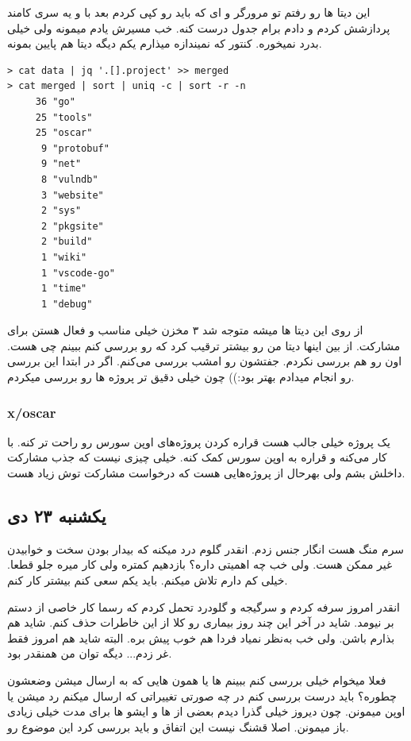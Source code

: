 این دیتا ها رو رفتم تو مرورگر و  ای که باید رو کپی کردم بعد با  و یه سری کامند پردازشش کردم و دادم  برام جدول درست کنه.
خب مسیرش یادم میمونه ولی خیلی بدرد نمیخوره. کنتور که نمیندازه میذارم یکم دیگه دیتا هم پایین بمونه.

\begin{latin}
\begin{verbatim}
> cat data | jq '.[].project' >> merged
> cat merged | sort | uniq -c | sort -r -n
     36 "go"
     25 "tools"
     25 "oscar"
      9 "protobuf"
      9 "net"
      8 "vulndb"
      3 "website"
      2 "sys"
      2 "pkgsite"
      2 "build"
      1 "wiki"
      1 "vscode-go"
      1 "time"
      1 "debug"
\end{verbatim}
\end{latin}

از روی این دیتا ها میشه متوجه شد ۳ مخزن  خیلی مناسب و فعال هستن برای مشارکت. از بین اینها دیتا من رو بیشتر ترقیب
کرد که  رو بررسی کنم ببینم چی هست. اون  رو هم بررسی نکردم. جفتشون رو امشب بررسی می‌کنم.
اگر در ابتدا این بررسی رو انجام میدادم بهتر بود:)) چون خیلی دقیق تر پروژه ها رو بررسی میکردم.

\subsubsection{x/oscar}
یک پروژه خیلی جالب هست قراره  کردن پروژه‌های اوپن سورس رو راحت تر کنه. با  کار می‌کنه و قراره به اوپن سورس کمک کنه.
خیلی چیزی نیست که جذب مشارکت داخلش بشم ولی بهرحال از پروژه‌هایی هست که درخواست مشارکت توش زیاد هست.

\subsection{یکشنبه ۲۳ دی}
سرم منگ هست انگار جنس زدم. انقدر گلوم درد میکنه که بیدار بودن سخت و خوابیدن غیر ممکن هست. ولی خب چه اهمیتی داره؟
بازدهیم کمتره ولی کار میره جلو قطعا. خیلی کم دارم تلاش میکنم. باید یکم سعی کنم بیشتر کار کنم.

انقدر امروز سرفه کردم و سرگیجه و گلودرد تحمل کردم که رسما کار خاصی از دستم بر نیومد. شاید در آخر این چند روز بیماری رو کلا از این خاطرات
حذف کنم. شاید هم بذارم باشن. ولی خب به‌نظر نمیاد فردا هم خوب پیش بره. البته شاید هم امروز فقط غر زدم... دیگه توان من همنقدر بود.

فعلا میخوام خیلی  بررسی کنم ببینم  ها یا همون \cl هایی که به  ارسال میشن وضعشون چطوره؟
باید درست بررسی کنم در چه صورتی تغییراتی که ارسال میکنم رد میشن یا اوپن میمونن. چون دیروز خیلی گذرا دیدم بعضی از \cl ها و ایشو ها
برای مدت خیلی زیادی باز میمونن. اصلا قشنگ نیست این اتفاق و باید بررسی کرد این موضوع رو.


